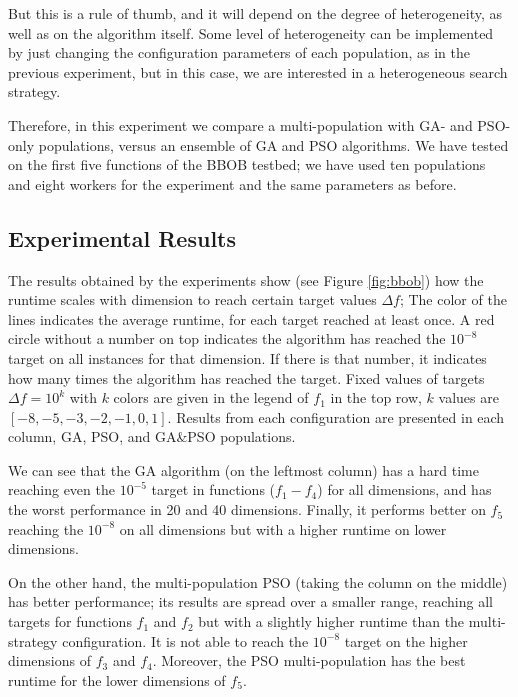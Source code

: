 \documentclass[review]{elsarticle}
\begin{document}
But this is a rule of thumb, and it will depend on the degree of heterogeneity,
as well as on the algorithm itself. Some level of heterogeneity can be
implemented by just changing the configuration parameters of each population,
as in the previous experiment, but in this case, we are interested in a heterogeneous search strategy.

Therefore, in this experiment we compare a multi-population with  GA- and PSO- only populations,
versus an ensemble of GA and PSO algorithms. We have tested on the first five functions of the
BBOB testbed; we have used ten populations and eight workers for the experiment and the
same parameters as before.

\subsection{Experimental Results} 

The results obtained by the experiments show (see Figure \ref{fig:bbob}) how
the runtime scales with dimension to reach certain target values $\Delta f$;
The color of the lines indicates the average runtime, for each target reached
at least once. A red circle without a number on top indicates the algorithm
has reached the $10^{-8}$ target on all instances for that dimension. If there
is that number, it indicates how many times the algorithm has reached
the target. Fixed values of targets $\Delta f = 10^{k}$ with $k$ colors are
given in the legend of $f_1$ in the top row, $k$ values are $[-8,-5,-3,-2,-1,0,1]$. Results
from each configuration are presented in each column, GA, PSO, and GA\&PSO
populations. %

We can see that the GA algorithm (on the leftmost column) has a hard time reaching even the
$10^{-5}$ target in functions ($f_1-f_4$) for all dimensions, and has the worst
performance in 20 and 40 dimensions. Finally, it performs better on $f_5$
reaching the $10^{-8}$ on all dimensions but with a higher runtime on lower
dimensions.

On the other hand, the multi-population PSO (taking the column on the middle) 
has better performance; its results are spread over a smaller range,
reaching all targets for functions $f_1$ and $f_2$ but with a slightly higher
runtime than the multi-strategy configuration. It is not able to reach the
$10^{-8}$ target on the higher dimensions of $f_3$ and $f_4$. Moreover, the PSO
multi-population has the best runtime for the lower dimensions of $f_5$.
\end{document}
